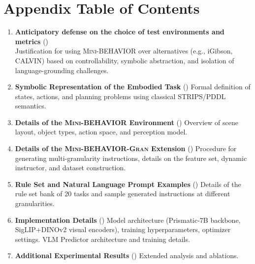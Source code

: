 \documentclass[11pt]{article}
\begin{document}
\section*{Appendix Table of Contents}
\begin{enumerate}[leftmargin=*]
    \item \textbf{Anticipatory defense on the choice of test environments and metrics} () \\
    Justification for using \textsc{Mini-BEHAVIOR} over alternatives (e.g., iGibson, CALVIN) based on controllability, symbolic abstraction, and isolation of language-grounding challenges.
    \item \textbf{Symbolic Representation of the Embodied Task} ()
    Formal definition of states, actions, and planning problems using classical STRIPS/PDDL semantics.
    \item \textbf{Details of the \textsc{Mini-BEHAVIOR} Environment} ()
    Overview of scene layout, object types, action space, and perception model.
    \item \textbf{Details of the \textsc{Mini-BEHAVIOR-Gran} Extension} ()
    Procedure for generating multi-granularity instructions, details on the feature set, dynamic instructor, and dataset construction.
    \item \textbf{Rule Set and Natural Language Prompt Examples} ()
    Details of the rule set bank of 20 tasks and sample generated instructions at different granularities.
    \item \textbf{Implementation Details} ()
    Model architecture (Prismatic-7B backbone, SigLIP+DINOv2 visual encoders), training hyperparameters, optimizer settings. VLM Predictor architecture and training details.
    \item \textbf{Additional Experimental Results} ()
    Extended analysis and ablations.
\end{enumerate}


\end{document}
